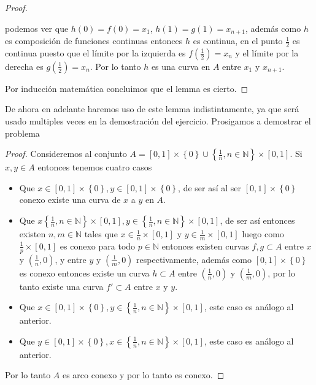 \documentclass[letterpaper]{article}
\theoremstyle{definition}
\theoremstyle{lemathm}
\theoremstyle{lemathm}
\theoremstyle{lemathm}
\theoremstyle{lemademthm}
\newcommand{\pars}[1]{\left( #1 \right) }
\newcommand{\bracs}[1]{\left[ #1 \right] }
\newcommand{\set}[1]{\left \{ #1 \right\} }
\newcommand{\NN}{\mathbb{N}}
\newcommand{\1}{\mathbbm{1}}
\begin{document}
\begin{enumerate}
\begin{proof}
\begin{itemize}
				podemos ver que $h(0) = f(0) = x_1$, $h(1) = g(1) = x_{n+1}$, además como $h$ es composición de funciones continuas entonces $h$ es continua, en el punto $\frac{1}{2}$ es continua puesto que el límite por la izquierda es $f\pars{\frac{1}{2}} = x_n$ y el límite por la derecha es $g\pars{\frac{1}{2}} = x_n$. Por lo tanto $h$ es una curva en $A$ entre $x_1$ y $x_{n+1}$.

			\end{itemize}

			Por inducción matemática concluimos que el lemma es cierto.
		\end{proof}

		De ahora en adelante haremos uso de este lemma indistintamente, ya que será usado multiples veces en la demostración del ejercicio. Prosigamos a demostrar el problema
		
		\begin{proof}
			Consideremos al conjunto $A = \bracs{0,1}\times \set{0} \cup \set{\frac{1}{n}, n\in\NN}\times \bracs{0,1}$. Si $x,y\in A$ entonces tenemos cuatro casos
			
			\begin{itemize}
				\item Que $x\in\bracs{0,1}\times \set{0},y\in \bracs{0,1}\times \set{0}$, de ser así al ser $\bracs{0,1}\times \set{0}$ conexo existe una curva de $x$ a $y$ en $A$.
				\item Que $x\set{\frac{1}{n}, n\in\NN}\times \bracs{0,1}, y\in\set{\frac{1}{n}, n\in\NN}\times \bracs{0,1}$, de ser así entonces existen $n,m\in\NN$ tales que $x\in \frac{1}{n}\times\bracs{0,1}$ y $y\in \frac{1}{m}\times\bracs{0,1}$ luego como $\frac{1}{p}\times\bracs{0,1}$ es conexo para todo $p\in\NN$ entonces existen curvas $f,g\subset A$ entre $x$ y $\pars{\frac{1}{n},0}$, y entre $y$ y $\pars{\frac{1}{m},0}$ respectivamente, además como $\bracs{0,1}\times \set{0}$ es conexo entonces existe un curva $h\subset A$ entre $\pars{\frac{1}{n},0}$ y $\pars{\frac{1}{m},0}$, por lo tanto existe una curva $f'\subset A$ entre $x$ y $y$.
				\item Que $x\in\bracs{0,1}\times \set{0}, y\in\set{\frac{1}{n}, n\in\NN}\times \bracs{0,1}$, este caso es análogo al anterior.
				\item Que $y\in\bracs{0,1}\times \set{0}, x\in\set{\frac{1}{n}, n\in\NN}\times \bracs{0,1}$, este caso es análogo al anterior.
			\end{itemize}
			
			Por lo tanto $A$ es arco conexo y por lo tanto es conexo.
			

\end{proof}
\end{enumerate}
\end{document}
